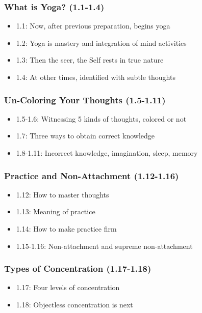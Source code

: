 \begin{frame}[fragile]\frametitle{What is Yoga? (1.1-1.4)}
\begin{itemize}
\item 1.1: Now, after previous preparation, begins yoga
\item 1.2: Yoga is mastery and integration of mind activities
\item 1.3: Then the seer, the Self rests in true nature  
\item 1.4: At other times, identified with subtle thoughts
\end{itemize}
\end{frame}

\begin{frame}[fragile]\frametitle{Un-Coloring Your Thoughts (1.5-1.11)}
\begin{itemize}
\item 1.5-1.6: Witnessing 5 kinds of thoughts, colored or not
\item 1.7: Three ways to obtain correct knowledge
\item 1.8-1.11: Incorrect knowledge, imagination, sleep, memory
\end{itemize}
\end{frame}

\begin{frame}[fragile]\frametitle{Practice and Non-Attachment (1.12-1.16)}
\begin{itemize}
\item 1.12: How to master thoughts
\item 1.13: Meaning of practice
\item 1.14: How to make practice firm
\item 1.15-1.16: Non-attachment and supreme non-attachment
\end{itemize}
\end{frame}

\begin{frame}[fragile]\frametitle{Types of Concentration (1.17-1.18)}
\begin{itemize}
\item 1.17: Four levels of concentration
\item 1.18: Objectless concentration is next
\end{itemize}
\end{frame}

